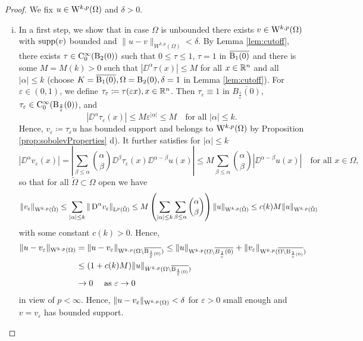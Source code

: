 \begin{proof}
  We fix $u \in \mathrm{W}^{k,p}(\Omega)$ and $\delta > 0$.
  \begin{enumerate}[i)]
    \item In a first step, we show that in case $\Omega$ is unbounded there exists $v \in \mathrm{W}^{k,p}(\Omega)$ with $\operatorname{supp}(v)$ bounded and $\|u - v\|_{W^{k,p}(\Omega)} < \delta$.
      By Lemma \ref{lem:cutoff}, there exists $\tau \in \mathrm{C}_0^\infty(\mathrm{B}_2(0))$ such that $0 \leq \tau \leq 1$, $\tau = 1$ in $\overline{\mathrm{B}_1(0)}$ and there is some $M = M(k) > 0$ such that $|\DD^\alpha \tau(x)| \leq M$ for all $x \in \mathbb{R}^n$ and all $|\alpha| \leq k$ (choose $K = \overline{\mathrm{B}_1(0)}, \Omega= \mathrm{B}_2(0), \delta = 1$ in Lemma \ref{lem:cutoff}).
      For $\varepsilon \in (0,1)$, we define $\tau_\varepsilon \coloneqq \tau(\varepsilon x), x \in \mathbb{R}^n$.
      Then $\tau_\varepsilon \equiv 1$ in $\overline{B_{\frac{1}{\varepsilon}}(0)}$, $\tau_\varepsilon \in \mathrm{C}_0^\infty(\mathrm{B}_{\frac{2}{\varepsilon}}(0))$, and
      \begin{equation}
        |\DD^\alpha \tau_\varepsilon(x)| \leq M \varepsilon^{|\alpha|} \leq M \quad\text{for all } |\alpha| \leq k.
      \end{equation}
      Hence, $v_\varepsilon \coloneqq \tau_\varepsilon u$ has bounded support and belongs to $\mathrm{W}^{k,p}(\Omega)$ by Proposition \ref{prop:sobolevProperties} d).
      It further satisfies for $|\alpha| \leq k$
      $$
      |\DD^\alpha v_\varepsilon(x)| 
      = | \sum_{\beta \leq \alpha} \binom{\alpha}{\beta} \DD^\beta \tau_\varepsilon(x) \DD^{\alpha - \beta} u(x)|
      \leq M \sum_{\beta \leq \alpha} \binom{\alpha}{\beta} | \DD^{\alpha - \beta} u(x)| \quad\text{for all } x \in\Omega,
      $$
      so that for all $\tilde\Omega \subset \Omega$ open we have
      $$
        \|v_\varepsilon\|_{\mathrm{W}^{k,p}(\tilde\Omega)}
        \leq \sum_{|\alpha|\leq k} \|\,{\operatorname{D}}^\alpha v_\varepsilon\|_{\mathrm{L}^p(\tilde\Omega)}
        \leq M \left( \sum_{|\alpha| \leq k} \sum_{\beta\leq\alpha} \binom{\alpha}{\beta} \right) \|u\|_{\mathrm{W}^{k,p}(\tilde\Omega)}
        \leq c(k) M \|u\|_{\mathrm{W}^{k,p}(\tilde\Omega)}
      $$
      with some constant $c(k) > 0$.
      Hence,
      \begin{align*}
        \|u - v_\varepsilon\|_{\mathrm{W}^{k,p}(\Omega)}
        &= \|u - v_\varepsilon\|_{\mathrm{W}^{k,p}(\Omega \setminus \overline{\mathrm{B}_{\frac{1}{\varepsilon}(0)}})}
        \leq \|u\|_{\mathrm{W}^{k,p}(\Omega \setminus \overline{B_{\frac{1}{\varepsilon}}(0)}} + \|v_\varepsilon\|_{\mathrm{W}^{k,p}(\overline{\Omega \setminus \mathrm{B}_{\frac{1}{\varepsilon}(0)}})} \\
        &\leq (1 + c(k)M) \|u\|_{W^{k,p}(\Omega \setminus \overline{\mathrm{B}_{\frac{1}{\varepsilon}(0)}})} \\
        &\to 0 \quad\text{ as } \varepsilon \to 0
      \end{align*}
      in view of $p < \infty$.
      Hence, $\|u - v_\varepsilon\|_{\mathrm{W}^{k,p}(\Omega)} < \delta$ for $\varepsilon > 0$ small enough and $v = v_\varepsilon$ has bounded support.


\end{enumerate}
\end{proof}
